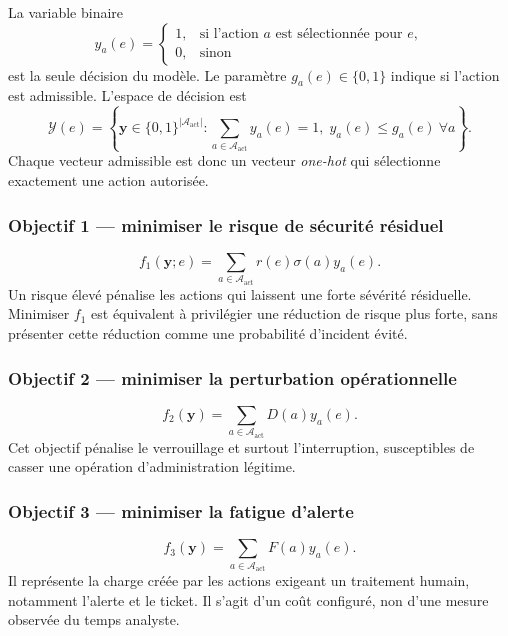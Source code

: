 \documentclass[11pt,a4paper,oneside]{report}
\theoremstyle{definition}
\theoremstyle{plain}
\begin{document}
La variable binaire
\[
y_a(e)=
\begin{cases}
1,&\text{si l'action }a\text{ est sélectionnée pour }e,\\
0,&\text{sinon}
\end{cases}
\]
est la seule décision du modèle. Le paramètre $g_a(e)\in\{0,1\}$ indique si
l'action est admissible. L'espace de décision est
\begin{equation}
\mathcal{Y}(e)=
\left\{\mathbf{y}\in\{0,1\}^{|\mathcal{A}_{\mathrm{act}}|}:
\sum_{a\in\mathcal{A}_{\mathrm{act}}}y_a(e)=1,\;
y_a(e)\leq g_a(e)\ \forall a\right\}.
\label{eq:ai-ro-response-space}
\end{equation}
Chaque vecteur admissible est donc un vecteur \emph{one-hot} qui sélectionne
exactement une action autorisée.

\subsubsection*{Objectif 1 --- minimiser le risque de sécurité résiduel}

\begin{equation}
f_1(\mathbf{y};e)=
\sum_{a\in\mathcal{A}_{\mathrm{act}}}
r(e)\sigma(a)y_a(e).
\label{eq:ai-ro-objective-security}
\end{equation}
Un risque élevé pénalise les actions qui laissent une forte sévérité
résiduelle. Minimiser $f_1$ est équivalent à privilégier une réduction de
risque plus forte, sans présenter cette réduction comme une probabilité
d'incident évité.

\subsubsection*{Objectif 2 --- minimiser la perturbation opérationnelle}

\begin{equation}
f_2(\mathbf{y})=
\sum_{a\in\mathcal{A}_{\mathrm{act}}}D(a)y_a(e).
\label{eq:ai-ro-objective-disruption}
\end{equation}
Cet objectif pénalise le verrouillage et surtout l'interruption, susceptibles
de casser une opération d'administration légitime.

\subsubsection*{Objectif 3 --- minimiser la fatigue d'alerte}

\begin{equation}
f_3(\mathbf{y})=
\sum_{a\in\mathcal{A}_{\mathrm{act}}}F(a)y_a(e).
\label{eq:ai-ro-objective-fatigue}
\end{equation}
Il représente la charge créée par les actions exigeant un traitement humain,
notamment l'alerte et le ticket. Il s'agit d'un coût configuré, non d'une
mesure observée du temps analyste.
\end{document}
